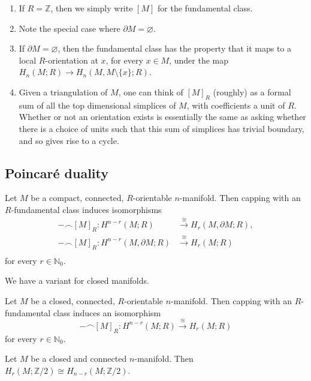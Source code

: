 \begin{enumerate}
    \item If $R = \mathbb Z$, then we simply write $[M]$ for the fundamental class.
    \item Note the special case where $\partial M = \varnothing$.
    \item If $\partial M = \varnothing$, then the fundamental class has the property that it maps to a local $R$-orientation at $x$, for every $x \in M$, under the map $H_n(M;R) \to H_n(M, M \setminus \{x\}; R)$.
    \item Given a triangulation of $M$, one can think of $[M]_R$ (roughly) as a formal sum of all the top dimensional simplices of $M$, with coefficients a unit of $R$. Whether or not an orientation exists is essentially the same as asking whether there is a choice of units such that this sum of simplices has trivial boundary, and so gives rise to a cycle.
\end{enumerate}

\subsection{Poincar\'e duality}

\begin{theorem}
    Let $M$ be a compact, connected, $R$-orientable $n$-manifold. Then capping with an $R$-fundamental class induces isomorphisms
    \begin{align*}
        - \frown [M]_R: H^{n-r}(M; R)             & \xrightarrow{\cong} H_r(M, \partial M; R), \\
        - \frown [M]_R: H^{n-r}(M, \partial M; R) & \xrightarrow{\cong} H_r(M; R)              \\
    \end{align*}
    for every $r \in \mathbb N_0$.
\end{theorem}

We have a variant for closed manifolds.

\begin{theorem}
    Let $M$ be a closed, connected, $R$-orientable $n$-manifold. Then capping with an $R$-fundamental class induces an isomorphism
    \[ - \frown [M]_R: H^{n-r}(M; R) \xrightarrow{\cong} H_r(M; R) \]
    for every $r \in \mathbb N_0$.
\end{theorem}

\begin{corollary}
    Let $M$ be a closed and connected $n$-manifold. Then $H_r(M; \mathbb Z/2) \cong H_{n-r}(M; \mathbb Z/2)$.
\end{corollary}

